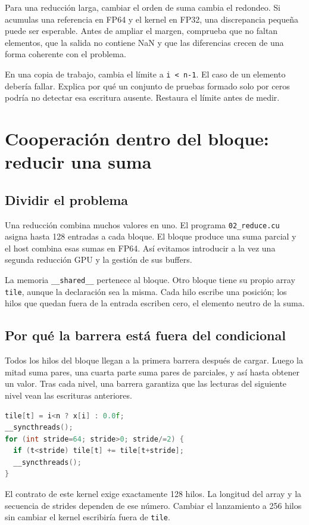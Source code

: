 \documentclass[12pt,a4paper,oneside]{report}
\begin{document}
Para una reducción larga, cambiar el orden de suma cambia el redondeo. Si acumulas una referencia en FP64 y el kernel en FP32, una discrepancia pequeña puede ser esperable. Antes de ampliar el margen, comprueba que no faltan elementos, que la salida no contiene NaN y que las diferencias crecen de una forma coherente con el problema.

\begin{comprueba}
En una copia de trabajo, cambia el límite a \texttt{i < n-1}. El caso de un elemento debería fallar. Explica por qué un conjunto de pruebas formado solo por ceros podría no detectar esa escritura ausente. Restaura el límite antes de medir.

\end{comprueba}
\chapter{Cooperación dentro del bloque: reducir una suma}
\section{Dividir el problema}
Una reducción combina muchos valores en uno. El programa \texttt{02\_reduce.cu} asigna hasta 128 entradas a cada bloque. El bloque produce una suma parcial y el host combina esas sumas en FP64. Así evitamos introducir a la vez una segunda reducción GPU y la gestión de sus buffers.

La memoria \texttt{\_\_shared\_\_} pertenece al bloque. Otro bloque tiene su propio array \texttt{tile}, aunque la declaración sea la misma. Cada hilo escribe una posición; los hilos que quedan fuera de la entrada escriben cero, el elemento neutro de la suma.

\section{Por qué la barrera está fuera del condicional}
Todos los hilos del bloque llegan a la primera barrera después de cargar. Luego la mitad suma pares, una cuarta parte suma pares de parciales, y así hasta obtener un valor. Tras cada nivel, una barrera garantiza que las lecturas del siguiente nivel vean las escrituras anteriores.

\begin{lstlisting}[language=C++]
tile[t] = i<n ? x[i] : 0.0f;
__syncthreads();
for (int stride=64; stride>0; stride/=2) {
  if (t<stride) tile[t] += tile[t+stride];
  __syncthreads();
}
\end{lstlisting}
El contrato de este kernel exige exactamente 128 hilos. La longitud del array y la secuencia de strides dependen de ese número. Cambiar el lanzamiento a 256 hilos sin cambiar el kernel escribiría fuera de \texttt{tile}.
\end{document}
